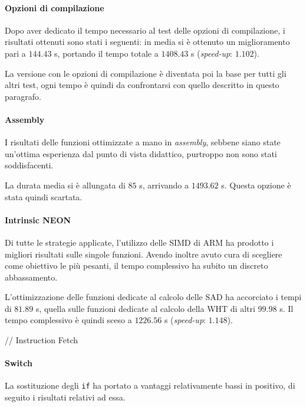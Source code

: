 \paragraph{Opzioni di compilazione \\}
  Dopo aver dedicato il tempo necessario al test delle opzioni di compilazione, 
  i risultati ottenuti sono stati i seguenti: in media si è ottenuto un 
  miglioramento pari a $144.43$ s, portando il tempo totale a $1408.43$ s 
  (\textit{speed-up}: $1.102$).
  
  La versione con le opzioni di compilazione è diventata poi la base per tutti 
  gli altri test, ogni tempo è quindi da confrontarsi con quello descritto in 
  questo paragrafo.
  
\paragraph{Assembly \\}
  I risultati delle funzioni ottimizzate a mano in \emph{assembly}, sebbene 
  siano state un'ottima esperienza dal punto di vista didattico, purtroppo non 
  sono stati soddisfacenti. 
  
  La durata media si è allungata di $85$ s, arrivando a $1493.62$ s. Questa 
  opzione è stata quindi scartata.
  
\paragraph{Intrinsic NEON \\}
  Di tutte le strategie applicate, l'utilizzo delle SIMD di ARM ha prodotto i 
  migliori risultati sulle singole funzioni. Avendo inoltre avuto cura di 
  scegliere come obiettivo le più pesanti, il tempo complessivo ha subito un 
  discreto abbassamento.
  
  L'ottimizzazione delle funzioni dedicate al calcolo delle SAD ha accorciato i 
  tempi di $81.89$ s, quella sulle funzioni dedicate al calcolo della WHT di 
  altri $99.98$ s. Il tempo complessivo è quindi sceso a $1226.56$ s   
  (\textit{speed-up}: $1.148$).
  
  // Instruction Fetch
  
\paragraph{Switch \\}
  La sostituzione degli \verb|if| ha portato a vantaggi relativamente bassi in 
  positivo, di seguito i risultati relativi ad essa.
  
